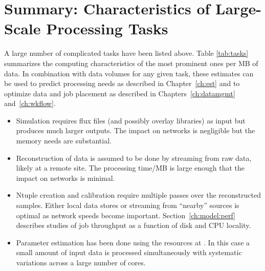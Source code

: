 \documentclass[../main-v1.tex]{subfiles}
\begin{document}


\section{Summary: Characteristics of Large-Scale Processing Tasks}

A large number of complicated tasks have been listed above.  Table \ref{tab:tasks} summarizes the computing characteristics of the most prominent ones per MB of data. In combination with data volumes for any given task, these estimates can be used to predict processing needs as described in Chapter~\ref{ch:est} and to optimize data and job placement as described in Chapters~\ref{ch:datamgmt} and~\ref{ch:wkflow}. 

\begin{itemize}
    \item Simulation requires flux files (and possibly overlay libraries) as input but produces much larger outputs. The impact on networks is negligible but the memory needs are substantial.
    \item Reconstruction of data is assumed to be done by streaming from raw data, likely at a remote site. The processing time/MB is large enough that the impact on networks is minimal. 
    \item Ntuple creation and calibration require multiple passes over the reconstructed samples. Either local data stores or streaming from ``nearby'' sources is optimal as network speeds become important. Section~\ref{ch:model:perf} describes studies of job throughput as a function of disk and CPU locality. 
    \item Parameter estimation has been done using the  resources at .  In this case a small amount of input data is processed simultaneously with systematic variations across a large number of cores. 

\end{itemize}
\end{document}
